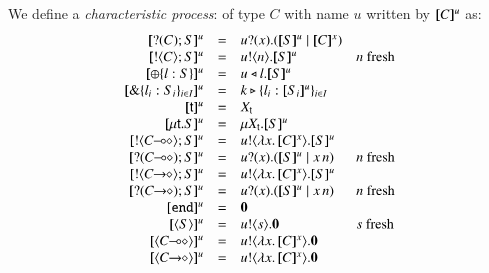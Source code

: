 \begin{definition}\rm
We define a {\em characteristic process}:
of type $C$ with name $u$ written by 
$[\!\![C]\!\!]^u$ as:
	\[
	\begin{array}{rcllrcll}
		\map{\btinp{C} S}^{u} &=& \binp{u}{x} (\map{S}^{u} \Par 
\map{{C}}^{x})\\
		\map{\btout{C} S}^{u} &=& \bout{u}{n} \map{S}^{u} & n\textrm{ fresh}
		\\
		\map{\btsel{l : S}}^{u} &=& \bsel{u}{l} \map{S}^{u}
\\
		\map{\btbra{l_i: S_i}_{i \in I}}^{u} &=& \bbra{k}{l_i: \map{S_i}^{u}}_{i \in I}
		\\

		\map{\tvar{t}}^{u} &=& \rvar{X}_{\tvar{t}}
\\
		\map{\trec{t}{S}}^{u} &=& \mu \rvar{X}_{\tvar{t}}.\map{S}^{u}
		\\

		\map{\btout{\lhot{C}} S}^{u} &=& \bout{u}{\abs{x}{\map{C}^{x}}} \map{S}^u
\\
		\map{\btinp{\lhot{C}} S}^{u} &=& \binp{u}{x} (\map{S}^u \Par \appl{x}{n}) & {n}\textrm{ fresh}
		\\
		\map{\btout{\shot{C}} S}^{u} &=& \bout{u}{\abs{x}{\map{C}^{x}}}
\map{S}^u \\
		\map{\btinp{\shot{C}} S}^{u} &=& \binp{u}{x} (\map{S}^u \Par \appl{x}{n}) & n\textrm{ fresh}
		\\

		\map{\tinact}^{u} &=& \inact
\\
		\map{\chtype{S}}^{u} &=& \bout{u}{s} \inact &s\textrm{ fresh}
\\
		\map{\chtype{\lhot{C}}}^{u} &=& \bout{u}{\abs{x} \map{C}^{x}} \inact
		\\
		\map{\chtype{\shot{C}}}^{u} &=& \bout{u}{\abs{x} \map{C}^{x}} \inact
	\end{array}
	\]
\end{definition}

